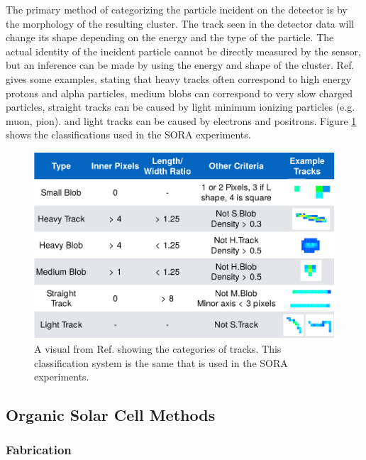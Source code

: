 The primary method of categorizing the particle incident on the detector is by the morphology of the resulting cluster.
The track seen in the detector data will change its shape depending on the energy and the type of the particle.
The actual identity of the incident particle cannot be directly measured by the sensor, but an inference can be made by using the energy and shape of the cluster. Ref. \cite{Stuart-Thesis} gives some examples, stating that heavy tracks often correspond to high energy protons and alpha particles, medium blobs can correspond to very slow charged particles, straight tracks can be caused by light minimum ionizing particles (e.g. muon, pion). and light tracks can be caused by electrons and positrons.     
Figure \ref{fig:stuart-track-types} shows the classifications used in the SORA experiments.
\begin{figure}[h!]
	\begin{center}
		\includegraphics[width=\textwidth]{figures/stuart-track-types.pdf}
		\caption{A visual from Ref. \cite{Stuart-Thesis} showing the categories of tracks. This classification system is the same that is used in the SORA experiments.}
		\label{fig:stuart-track-types}
	\end{center}
\end{figure}

\subsection{Organic Solar Cell Methods}
\label{sec:Solar-Cell-Methods}



\subsubsection{Fabrication}

